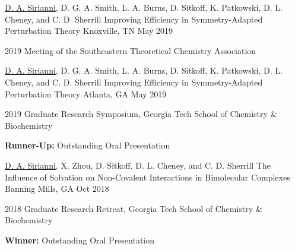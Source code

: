 
\begin{cventries}


  \cventry
    {\underline{D. A. Sirianni}, D. G. A. Smith, L. A. Burns, D. Sitkoff, K. Patkowski, D. L. Cheney, and C. D. Sherrill} %
    {Improving Efficiency in Symmetry-Adapted Perturbation Theory} %
    {Knoxville, TN} %
    {May 2019} %
    {%
    \begin{cvitems}
    \item[] 2019 Meeting of the Southeastern Theoretical Chemistry Association %
    \end{cvitems}
    }

  \cventry
    {\underline{D. A. Sirianni}, D. G. A. Smith, L. A. Burns, D. Sitkoff, K. Patkowski, D. L. Cheney, and C. D. Sherrill} %
    {Improving Efficiency in Symmetry-Adapted Perturbation Theory} %
    {Atlanta, GA} %
    {May 2019} %
    {%
    \begin{cvitems}
    \item[] 2019 Graduate Research Symposium, Georgia Tech School of Chemistry \& Biochemistry %
    \item[] {\bf Runner-Up:} Outstanding Oral Presentation
    \end{cvitems}
    }

  \cventry
    {\underline{D. A. Sirianni}, X. Zhou, D. Sitkoff, D. L. Cheney, and C. D. Sherrill} %
    {The Influence of Solvation on Non-Covalent Interactions in Bimolecular Complexes} %
    {Banning Mills, GA} %
    {Oct 2018} %
    {%
    \begin{cvitems}
    \item[] 2018 Graduate Research Retreat, Georgia Tech School of Chemistry \& Biochemistry
    \item[] {\bf Winner:} Outstanding Oral Presentation
    \end{cvitems}
    }


\end{cventries}
